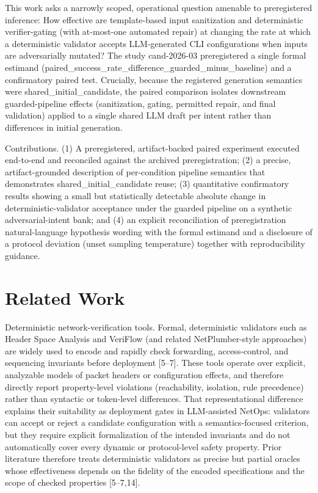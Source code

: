 \documentclass[conference]{IEEEtran}
\begin{document}
This work asks a narrowly scoped, operational question amenable to preregistered inference: How effective are template-based input sanitization and deterministic verifier-gating (with at-most-one automated repair) at changing the rate at which a deterministic validator accepts LLM-generated CLI configurations when inputs are adversarially mutated? The study cand-2026-03 preregistered a single formal estimand (paired\_success\_rate\_difference\_guarded\_minus\_baseline) and a confirmatory paired test. Crucially, because the registered generation semantics were shared\_initial\_candidate, the paired comparison isolates downstream guarded-pipeline effects (sanitization, gating, permitted repair, and final validation) applied to a single shared LLM draft per intent rather than differences in initial generation.

Contributions. (1) A preregistered, artifact-backed paired experiment executed end-to-end and reconciled against the archived preregistration; (2) a precise, artifact-grounded description of per-condition pipeline semantics that demonstrates shared\_initial\_candidate reuse; (3) quantitative confirmatory results showing a small but statistically detectable absolute change in deterministic-validator acceptance under the guarded pipeline on a synthetic adversarial-intent bank; and (4) an explicit reconciliation of preregistration natural-language hypothesis wording with the formal estimand and a disclosure of a protocol deviation (unset sampling temperature) together with reproducibility guidance.

\section{Related Work}
Deterministic network-verification tools. Formal, deterministic validators such as Header Space Analysis and VeriFlow (and related NetPlumber-style approaches) are widely used to encode and rapidly check forwarding, access-control, and sequencing invariants before deployment [5--7]. These tools operate over explicit, analyzable models of packet headers or configuration effects, and therefore directly report property-level violations (reachability, isolation, rule precedence) rather than syntactic or token-level differences. That representational difference explains their suitability as deployment gates in LLM-assisted NetOps: validators can accept or reject a candidate configuration with a semantics-focused criterion, but they require explicit formalization of the intended invariants and do not automatically cover every dynamic or protocol-level safety property. Prior literature therefore treats deterministic validators as precise but partial oracles whose effectiveness depends on the fidelity of the encoded specifications and the scope of checked properties [5--7,14].
\end{document}
